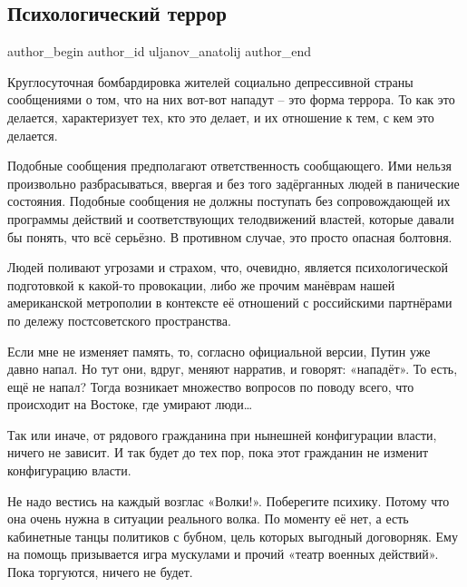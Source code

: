  
 
 
 
 
 
\subsection{Психологический террор}
\label{sec:20_01_2022.fb.uljanov_anatolij.1.psiho_terror}
 
\ifcmt
 author_begin
   author_id uljanov_anatolij
 author_end
\fi

Круглосуточная бомбардировка жителей социально депрессивной страны сообщениями
о том, что на них вот-вот нападут – это форма террора. То как это делается,
характеризует тех, кто это делает, и их отношение к тем, с кем это делается. 


Подобные сообщения предполагают ответственность сообщающего. Ими нельзя
произвольно разбрасываться, ввергая и без того задёрганных людей в панические
состояния. Подобные сообщения не должны поступать без сопровождающей их
программы действий и соответствующих телодвижений властей, которые давали бы
понять, что всё серьёзно. В противном случае, это просто опасная болтовня.

Людей поливают угрозами и страхом, что, очевидно, является психологической
подготовкой к какой-то провокации, либо же прочим манёврам нашей американской
метрополии в контексте её отношений с российскими партнёрами по дележу
постсоветского пространства.

Если мне не изменяет память, то, согласно официальной версии, Путин уже давно
напал. Но тут они, вдруг, меняют нарратив, и говорят: «нападёт». То есть, ещё
не напал? Тогда возникает множество вопросов по поводу всего, что происходит на
Востоке, где умирают люди…

Так или иначе, от рядового гражданина при нынешней конфигурации власти, ничего
не зависит. И так будет до тех пор, пока этот гражданин не изменит конфигурацию
власти. 

Не надо вестись на каждый возглас «Волки!». Поберегите психику. Потому что она
очень нужна в ситуации реального волка. По моменту её нет, а есть кабинетные
танцы политиков с бубном, цель которых выгодный договорняк. Ему на помощь
призывается игра мускулами и прочий «театр военных действий». Пока торгуются,
ничего не будет.
